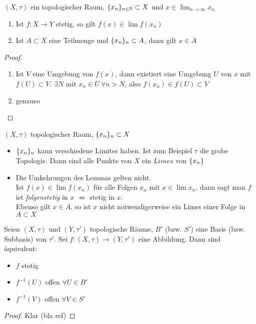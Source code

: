 \begin{lem}
    $(X,\tau)$ ein topologischer Raum, $\mdef{x_n}_{n\in\N}\subset X$ und
    $x\in\lim_{n\to\infty}x_n$
    \begin{enumerate}
        \item Ist $f:X\to Y$ stetig, so gilt $f(x)\in \lim f(x_n)$
        \item Ist $A\subset X$ eine Teilmenge und $\mdef{x_n}_n \subset A$, dann gilt
            $x\in\overline{A}$
    \end{enumerate}
    \begin{proof}
        \begin{enumerate}
            \item Ist $V$ eine Umgebung von $f(x)$, dann existiert eine Umgebung
                $U$ von $x$ mit $f(U)\subset V$. $\exists N$ mit $x_n\in U\ \forall
                n > N$, also $f(x_n)\in f(U)\subset V$
            \item genauso
        \end{enumerate}
    \end{proof}
    \begin{bem}
        $(X,\tau)$ topologischer Raum, $\mdef{x_n}_n\subset X$
        \begin{itemize}
            \item $\mdef{x_n}_n$ kann verschiedene Limites haben. Ist zum Beispiel
                $\tau$ die grobe Topologie. Dann sind alle Punkte von $X$ ein $Limes$
                von $\mdef{x_n}$
            \item Die Umkehrungen des Lemmas gelten nicht.\\
                Ist $f(x) \in \lim f(x_n)$ für alle Folgen $x_n$ mit $x\in\lim x_n$,
                dann sagt man $f$ ist \emph{folgenstetig} in $x$ $\nRightarrow$
                stetig in $x$.\\
                Ebenso gilt $x\in\overline{A}$, so ist $x$ nicht notwendigerweise ein
                Limes einer Folge in $A\subset X$
        \end{itemize}
    \end{bem}
\end{lem}

\begin{stz}
    Seien $(X,\tau)$ und $(Y,\tau')$ topologische Räume, $B'$ (bzw. $S'$) eine Basis
    (bzw. Subbasis) von $\tau'$. Sei $f:(X,\tau)\to(Y,\tau')$ eine Abbildung.
    Dann sind äquivalent:
    \begin{itemize}
        \item $f$ stetig
        \item $f^{-1}(U)$ offen $\forall U\in B'$
        \item $f^{-1}(V)$ offen $\forall V\in S'$
    \end{itemize}
    \begin{proof}
        Klar (bla ref)
    \end{proof}
\end{stz}

